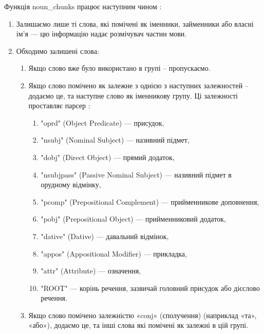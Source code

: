 \documentclass[14pt]{extarticle}
\begin{document}
  Функція noun\_chunks працює наступним чином \cite{wiki_noun_chunks_impl}:

  \begin{enumerate}[labelindent=\dimexpr\parindent*2\relax, leftmargin=*]
    \item Залишаємо лише ті слова, які помічені як іменники,
      займенники або власні ім'я --- цю інформацію надає розмічувач частин мови.
    \item Обходимо залишені слова:
    \begin{enumerate}
      \item Якщо слово вже було використано в групі -- пропускаємо.
      \item Якщо слово помічено як залежне з однією з наступних залежностей -- додаємо це, та наступне слово як іменникову групу.
        Ці залежності проставляє парсер \cite{spacy_label_scheme}:
        \begin{enumerate}
          \item "oprd" (Object Predicate) \cite{wiki_predicate_grammar} ---
            присудок,
          \item "nsubj" (Nominal Subject) \cite{nsubj_dep} --- називний підмет,
          \item "dobj" (Direct Object) \cite{wiki_dobj} --- прямий додаток,
          \item "nsubjpass" (Passive Nominal Subject) \cite{nsubj_pass_dep} ---
            називний підмет в орудному відмінку,
          \item "pcomp" (Prepositional Complement)
            \cite{wiki_prepositional_phrases} --- прийменникове доповнення,
          \item "pobj" (Prepositional Object) --- прийменниковий додаток,
          \item "dative" (Dative) \cite{wiki_dative} --- давальний відмінок,
          \item "appos" (Appositional Modifier) \cite{appos_dep} --- прикладка,
          \item "attr" (Attribute) \cite{wiki_grammatical_modifier} ---
            означення,
          \item "ROOT" \cite{root_dep} --- корінь речення,
            зазвичай головний присудок або дієслово речення.
        \end{enumerate}
     \item Якщо слово помічено залежністю «conj» (сполучення)
       \cite{wiki_conjunction, conj_dep}
       (наприклад «та», «або»),
       додаємо це, та інші слова які помічені як залежні в цій групі.
    \end{enumerate}
  \end{enumerate}
\end{document}
